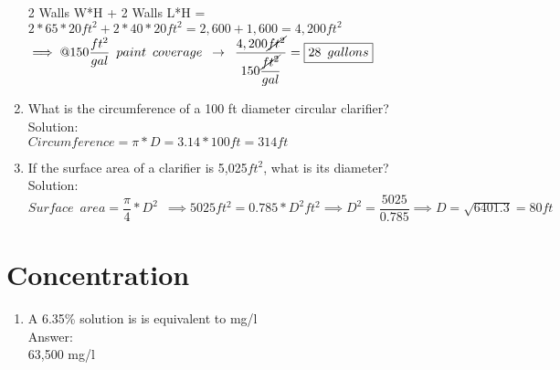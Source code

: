 \begin{enumerate}
\begin{center}
\\
\end{center}
2 Walls W*H + 2 Walls L*H = $2*65*20ft^2 + 2*40*20ft^2= 2,600+1,600=4,200ft^2$\\
$\implies @150\dfrac{ft^2}{gal} \enspace paint \enspace coverage \enspace \rightarrow \enspace \dfrac{4,200\cancel{ft^2}}{150\dfrac{\cancel{ft^2}}{gal}}=\boxed{28 \enspace gallons}$

\item What is the circumference of a 100 ft diameter circular clarifier?\\
Solution:\\
$Circumference=\pi*D=3.14*100ft=\boxed{314ft}$

\item If the surface area of a clarifier is 5,025$ft^2$, what is its diameter?\\
Solution:\\
$Surface \enspace area=\dfrac{\pi}{4}*D^2 \enspace \implies 5025ft^2=0.785*D^2 ft^2\implies D^2=\dfrac{5025}{0.785} \implies D=\sqrt{6401.3}=\boxed{80ft}$

\end{enumerate}

\section{Concentration}
\begin{enumerate}
\item A 6.35\% solution is is equivalent to {\underline{\hspace{1cm}}} mg/l\\
Answer:\\
63,500 mg/l\\
\end{enumerate}
